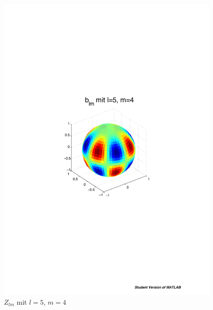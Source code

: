 \begin{refsection}
\begin{figure}
\begin{minipage}[hbt]{0.4\textwidth}
\includegraphics[width=1\textwidth]{kugel/ylm/b_5_4.pdf}
\caption{$Z_{lm}$ mit $l=5$, $m=4$}
\label{skript:zlm l=5 m=4}
\end{minipage}
\begin{minipage}[hbt]{0.4\textwidth}
\centering

\end{minipage}
\end{figure}
\end{refsection}
